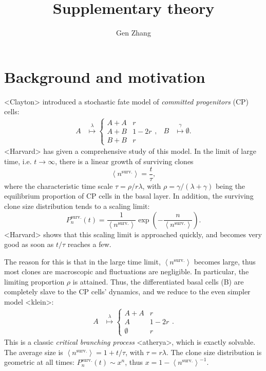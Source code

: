 \documentclass[10pt,UKenglish]{article}
\begin{document}
\title{Supplementary theory}
\author{Gen Zhang}
 
\maketitle

\renewcommand{\thesection}{S-\Roman{section}}

\section{Background and motivation}

<Clayton> introduced a stochastic fate model of \emph{committed progenitors} (CP) cells:
\begin{align}
A &\overset{\lambda}{\longmapsto} \begin{cases}
A+A & r \\
A+B & 1-2r \\
B+B & r\end{cases}, & B &\overset{\gamma}{\longmapsto} \emptyset.
\label{eq:basal-model}
\end{align}
<Harvard> has given a comprehensive study of this model. In the limit of large time, i.e. $t\rightarrow \infty$, there is a linear growth of surviving clones $$\left\langle n^\textrm{surv.} \right\rangle = \frac{t}{\tau},$$ where the characteristic time scale $\tau = \rho/r\lambda$, with $\rho = \gamma/(\lambda+\gamma)$ being the equilibrium proportion of CP cells in the basal layer. In addition, the surviving clone size distribution tends to a scaling limit: $$P^\textrm{surv.}_n(t) = \frac{1}{\left\langle n^\textrm{surv.} \right\rangle}\exp\left(-\frac{n}{\left\langle n^\textrm{surv.} \right\rangle}\right).$$ <Harvard> shows that this scaling limit is approached quickly, and becomes very good as soon as $t/\tau$ reaches a few.

The reason for this is that in the large time limit, $\left\langle n^\textrm{surv.} \right\rangle$ becomes large, thus most clones are macroscopic and fluctuations are negligible. In particular, the limiting proportion $\rho$ is attained. Thus, the differentiated basal cells (B) are completely slave to the CP cells' dynamics, and we reduce to the even simpler model <klein>: 
\begin{align}
A &\overset{\lambda}{\longmapsto} \begin{cases}
A+A & r \\
A & 1-2r \\
\emptyset & r\end{cases}\label{eq:simple-balanced-model}.
\end{align}
This is a classic \emph{critical branching process} <atherya>, which is exactly solvable. The average size is $\left\langle n^\textrm{surv.} \right\rangle = 1+t/\tau$, with $\tau = r\lambda$. The clone size distribution is geometric at all times: $P^\textrm{surv.}_n(t) \sim x^n$, thus $x = 1 - \left\langle n^\textrm{surv.} \right\rangle^{-1}$.
\end{document}
